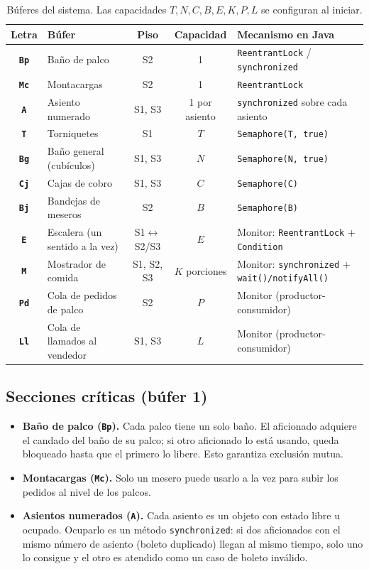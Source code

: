\documentclass[11pt,letterpaper]{article}
\newcommand{\buf}[1]{\textbf{\texttt{#1}}}
\newcommand{\code}[1]{\texttt{#1}}
\begin{document}
\begin{table}[H]
\centering
\small
\begin{tabularx}{\linewidth}{c l c c L}
\toprule
Letra & Búfer & Piso & Capacidad & Mecanismo en Java \\
\midrule
\buf{Bp} & Baño de palco & S2 & 1 & \code{ReentrantLock} / \code{synchronized} \\
\buf{Mc} & Montacargas & S2 & 1 & \code{ReentrantLock} \\
\buf{A}  & Asiento numerado & S1, S3 & 1 por asiento & \code{synchronized} sobre cada asiento \\
\midrule
\buf{T}  & Torniquetes & S1 & $T$ & \code{Semaphore(T, true)} \\
\buf{Bg} & Baño general (cubículos) & S1, S3 & $N$ & \code{Semaphore(N, true)} \\
\buf{Cj} & Cajas de cobro & S1, S3 & $C$ & \code{Semaphore(C)} \\
\buf{Bj} & Bandejas de meseros & S2 & $B$ & \code{Semaphore(B)} \\
\buf{E}  & Escalera (un sentido a la vez) & S1$\leftrightarrow$S2/S3 & $E$ & Monitor: \code{ReentrantLock} + \code{Condition} \\
\buf{M}  & Mostrador de comida & S1, S2, S3 & $K$ porciones & Monitor: \code{synchronized} + \code{wait()/notifyAll()} \\
\buf{Pd} & Cola de pedidos de palco & S2 & $P$ & Monitor (productor-consumidor) \\
\buf{Ll} & Cola de llamados al vendedor & S1, S3 & $L$ & Monitor (productor-consumidor) \\
\bottomrule
\end{tabularx}
\caption{Búferes del sistema. Las capacidades $T, N, C, B, E, K, P, L$ se configuran al iniciar.}
\label{tab:buferes}
\end{table}

\subsection{Secciones críticas (búfer 1)}
\begin{itemize}
  \item \textbf{Baño de palco (\buf{Bp}).} Cada palco tiene un solo baño. El aficionado adquiere el candado del baño de su palco; si otro aficionado lo está usando, queda bloqueado hasta que el primero lo libere. Esto garantiza exclusión mutua.
  \item \textbf{Montacargas (\buf{Mc}).} Solo un mesero puede usarlo a la vez para subir los pedidos al nivel de los palcos.
  \item \textbf{Asientos numerados (\buf{A}).} Cada asiento es un objeto con estado libre u ocupado. Ocuparlo es un método \code{synchronized}: si dos aficionados con el mismo número de asiento (boleto duplicado) llegan al mismo tiempo, solo uno lo consigue y el otro es atendido como un caso de boleto inválido.
\end{itemize}
\end{document}
